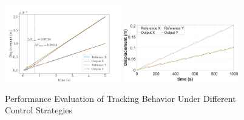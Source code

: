 \documentclass[12pt]{article}
\begin{document}
\begin{enumerate}
    \begin{figure}[H]
        \centering
        \includegraphics[width=0.45\textwidth]{portfolio/fig01_TrackingBehavior.png}
        \includegraphics[width=0.45\textwidth]{portfolio/feedforward_track.png}
        \caption{Performance Evaluation of Tracking Behavior Under Different Control Strategies}
        \label{Control-RobotSwimmer}
    \end{figure}
\end{enumerate}

\newpage








\end{document}
